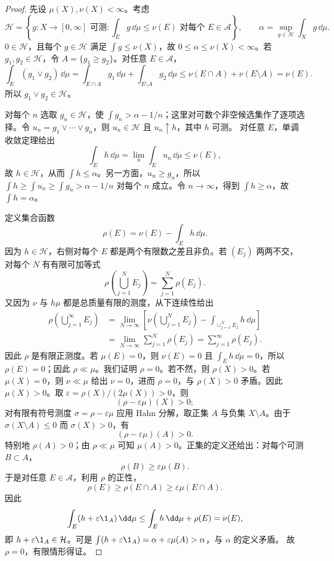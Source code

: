 \begin{proof}
先设 $\mu(X),\nu(X)<\infty$。考虑
\[
 \mathcal H=\left\{g:X\to[0,\infty]\text{ 可测}:
     \int_Eg\,\dd\mu\le\nu(E)\text{ 对每个 }E\in\mathcal A\right\},
 \qquad
 \alpha=\sup_{g\in\mathcal H}\int_Xg\,\dd\mu.
\]
$0\in\mathcal H$，且每个 $g\in\mathcal H$ 满足 $\int g\le\nu(X)$，故
$0\le\alpha\le\nu(X)<\infty$。若 $g_1,g_2\in\mathcal H$，令
$A=\{g_1\ge g_2\}$。对任意 $E\in\mathcal A$，
\[
 \int_E(g_1\vee g_2)\,\dd\mu
 =\int_{E\cap A}g_1\,\dd\mu+\int_{E\setminus A}g_2\,\dd\mu
 \le\nu(E\cap A)+\nu(E\setminus A)=\nu(E).
\]
所以 $g_1\vee g_2\in\mathcal H$。

对每个 $n$ 选取 $g_n\in\mathcal H$，使
$\int g_n>\alpha-1/n$；这里对可数个非空候选集作了逐项选择。令
$u_n=g_1\vee\cdots\vee g_n$，则 $u_n\in\mathcal H$ 且 $u_n\uparrow h$，其中 $h$ 可测。
对任意 $E$，单调收敛定理给出
\[
 \int_Eh\,\dd\mu=\lim_n\int_Eu_n\,\dd\mu\le\nu(E),
\]
故 $h\in\mathcal H$，从而 $\int h\le\alpha$。另一方面，$u_n\ge g_n$，所以
$\int h\ge\int u_n\ge\int g_n>\alpha-1/n$ 对每个 $n$ 成立。令 $n\to\infty$，得到
$\int h\ge\alpha$，故 $\int h=\alpha$。

定义集合函数
\[
  \rho(E)=\nu(E)-\int_Eh\,\dd\mu.
\]
因为 $h\in\mathcal H$，右侧对每个 $E$ 都是两个有限数之差且非负。若 $(E_j)$ 两两不交，对每个
$N$ 有有限可加等式
\[
 \rho\!\left(\bigcup_{j=1}^NE_j\right)=\sum_{j=1}^N\rho(E_j).
\]
又因为 $\nu$ 与 $h\mu$ 都是总质量有限的测度，从下连续性给出
\[
 \begin{aligned}
 \rho\!\left(\bigcup_{j=1}^{\infty}E_j\right)
 &=\lim_{N\to\infty}
   \left[\nu\!\left(\bigcup_{j=1}^NE_j\right)
       -\int_{\cup_{j=1}^NE_j}h\,\dd\mu\right]\\
 &=\lim_{N\to\infty}\sum_{j=1}^N\rho(E_j)
 =\sum_{j=1}^{\infty}\rho(E_j).
 \end{aligned}
\]
因此 $\rho$ 是有限正测度。若 $\mu(E)=0$，则 $\nu(E)=0$ 且
$\int_Eh\,\dd\mu=0$，所以 $\rho(E)=0$；因此 $\rho\ll\mu$。我们证明 $\rho=0$。若不然，则
$\rho(X)>0$。若 $\mu(X)=0$，则 $\nu\ll\mu$ 给出 $\nu=0$，进而 $\rho=0$，与
$\rho(X)>0$ 矛盾。因此 $\mu(X)>0$。取
$\varepsilon=\rho(X)/(2\mu(X))>0$，则
\[
  (\rho-\varepsilon\mu)(X)>0;
\]
对有限有符号测度 $\sigma=\rho-\varepsilon\mu$ 应用 Hahn 分解，取正集 $A$ 与负集
$X\setminus A$。由于
$\sigma(X\setminus A)\le0$ 而 $\sigma(X)>0$，有
\[
 (\rho-\varepsilon\mu)(A)>0.
\]
特别地 $\rho(A)>0$；由 $\rho\ll\mu$ 可知 $\mu(A)>0$。正集的定义还给出：对每个可测
$B\subset A$，
\[
  \rho(B)\ge\varepsilon\mu(B).
\]
于是对任意 $E\in\mathcal A$，利用 $\rho$ 的正性，
\[
 \rho(E)\ge\rho(E\cap A)\ge\varepsilon\mu(E\cap A).
\]
因此
\[
 \int_E(h+\varepsilon\1_A)\,\dd\mu
 \le\int_Eh\,\dd\mu+\rho(E)=\nu(E),
\]
即 $h+\varepsilon\1_A\in\mathcal H$。可是
$\int(h+\varepsilon\1_A)=\alpha+\varepsilon\mu(A)>\alpha$，与 $\alpha$ 的定义矛盾。
故 $\rho=0$，有限情形得证。


\end{proof}

